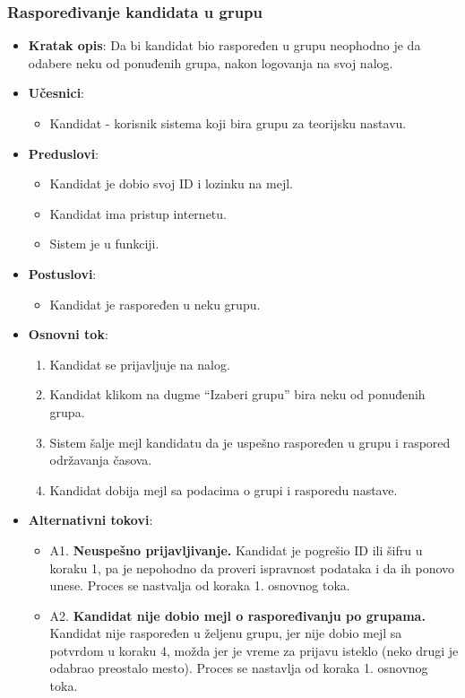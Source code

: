\subsubsection{Raspoređivanje kandidata u grupu}
\label{subsubsec:grupe}
\begin{itemize}
  \item \textbf{Kratak opis}: Da bi kandidat bio raspoređen u grupu neophodno je da odabere neku od ponuđenih grupa, nakon logovanja na svoj nalog. 
  \item \textbf{Učesnici}: 
    \begin{itemize}
    \item  Kandidat - korisnik sistema koji bira grupu za teorijsku nastavu.
    \end{itemize}
  \item \textbf{Preduslovi}:
    \begin{itemize}
    \item Kandidat je dobio svoj ID i lozinku na mejl.
    \item Kandidat ima pristup internetu.
    \item Sistem je u funkciji.
    \end{itemize}
  \item \textbf{Postuslovi}:
      \begin{itemize}
      \item Kandidat je raspoređen u neku grupu.
      \end{itemize}
  
     
  \item \textbf{Osnovni tok}: 
      \begin{enumerate}
        \item Kandidat se prijavljuje na nalog.
        \item Kandidat klikom na dugme “Izaberi grupu” bira neku od ponuđenih grupa.
        \item Sistem šalje mejl kandidatu da je uspešno raspoređen u grupu i raspored održavanja časova.
        \item Kandidat dobija mejl sa podacima o grupi i rasporedu nastave.
      \end{enumerate}

  \item \textbf{Alternativni tokovi}:
      \begin{itemize}
        \item A1. \textbf{Neuspešno prijavljivanje.}
        Kandidat je pogrešio ID ili šifru u koraku 1, pa je nepohodno da proveri ispravnost podataka i da ih ponovo unese. Proces se nastvalja od koraka 1. osnovnog toka.
        \item A2. \textbf{Kandidat nije dobio mejl o raspoređivanju po grupama.}
        Kandidat nije raspoređen u željenu grupu, jer nije dobio mejl sa potvrdom u koraku 4, možda jer je vreme za prijavu isteklo (neko drugi je odabrao preostalo mesto). Proces se nastavlja od koraka 1. osnovnog toka.
      \end{itemize}



\end{itemize}
